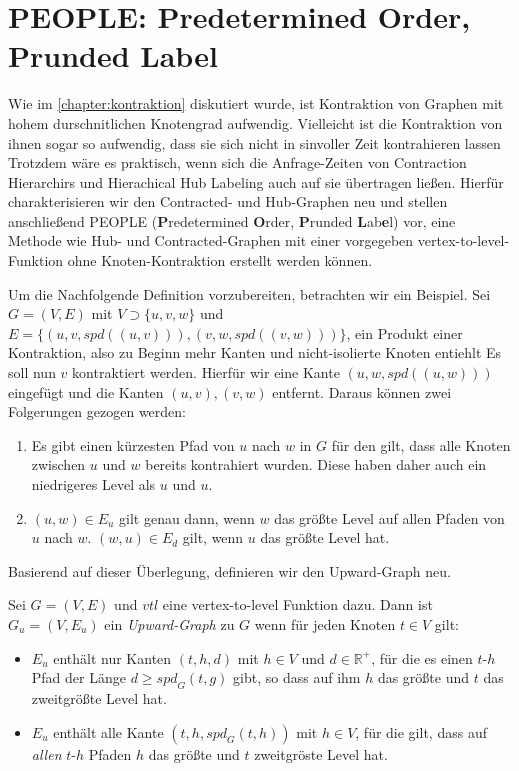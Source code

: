 \chapter{PEOPLE: Predetermined Order, Prunded Label}\label{chapter:peopel}

Wie im \autoref{chapter:kontraktion} diskutiert wurde, ist Kontraktion von Graphen mit hohem durschnitlichen Knotengrad aufwendig.
Vielleicht ist die Kontraktion von ihnen sogar so aufwendig, dass sie sich nicht in sinvoller Zeit kontrahieren lassen
Trotzdem wäre es praktisch, wenn sich die Anfrage-Zeiten von Contraction Hierarchirs und Hierachical Hub Labeling auch auf sie übertragen ließen.
Hierfür charakterisieren wir den Contracted- und Hub-Graphen neu und stellen anschließend PEOPLE (\textbf{P}redetermined \textbf{O}rder, \textbf{P}runded \textbf{L}ab\textbf{e}l) vor, eine Methode wie Hub- und Contracted-Graphen mit einer vorgegeben vertex-to-level-Funktion ohne Knoten-Kontraktion erstellt werden können.

Um die Nachfolgende Definition vorzubereiten, betrachten wir ein Beispiel.
Sei $G = (V, E)$ mit $V \supset \{ u, v, w \}$ und $E = \{ (u, v, {spd}((u, v))), (v, w, {spd}((v, w))) \}$, ein Produkt einer Kontraktion, also zu Beginn mehr Kanten und nicht-isolierte Knoten entiehlt
Es soll nun $v$ kontraktiert werden.
Hierfür wir eine Kante $(u, w, {spd}((u, w)))$ eingefügt und die Kanten $(u, v), (v, w)$ entfernt.
Daraus können zwei Folgerungen gezogen werden:

\begin{enumerate}
  \item
        Es gibt einen kürzesten Pfad von $u$ nach $w$ in $G$ für den gilt, dass alle Knoten zwischen $u$ und $w$ bereits kontrahiert wurden.
        Diese haben daher auch ein niedrigeres Level als $u$ und $u$.

  \item
        $(u, w) \in E_u$ gilt genau dann, wenn $w$ das größte Level auf allen Pfaden von $u$ nach $w$.
        $(w, u) \in E_d$ gilt, wenn $u$ das größte Level hat.
\end{enumerate}

Basierend auf dieser Überlegung, definieren wir den Upward-Graph neu.

\begin{definition}\label{people:def:upward_graph}
  Sei $G = (V, E)$ und ${vtl}$ eine vertex-to-level Funktion dazu.
  Dann ist $G_u = (V, E_u)$ ein \emph{Upward-Graph} zu $G$ wenn für jeden Knoten $t \in V$ gilt:

  \begin{itemize}
    \item
          $E_u$ enthält nur Kanten $(t, h, d)$ mit $h \in V$ und $d \in \mathbb{R}^+$, für die es einen $t$-$h$ Pfad der Länge $d \geq {spd}_G (t, g)$ gibt, so dass auf ihm $h$ das größte und $t$ das zweitgrößte Level hat.

    \item
          $E_u$ enthält alle Kante $(t, h, {spd}_G (t, h))$ mit $h \in V$, für die gilt, dass auf \emph{allen} $t$-$h$ Pfaden $h$ das größte und $t$ zweitgröste Level hat.
  \end{itemize}
\end{definition}

